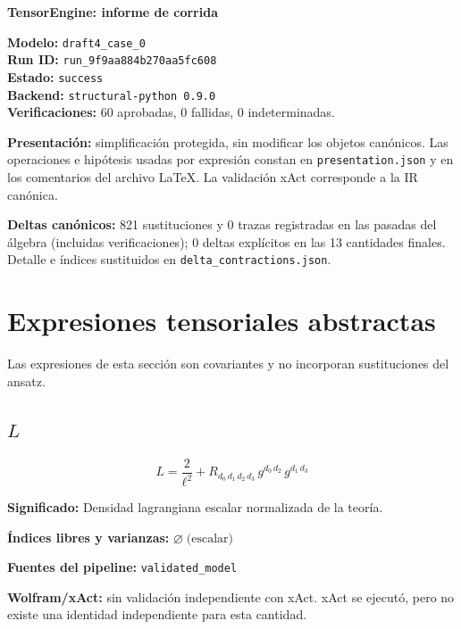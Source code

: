 \documentclass[11pt]{article}
\begin{document}
\begin{center}
{\Large\bfseries TensorEngine: informe de corrida}
\end{center}
\textbf{Modelo:} \texttt{draft4\_case\_0}\\
\textbf{Run ID:} \texttt{run\_9f9aa884b270aa5fc608}\\
\textbf{Estado:} \texttt{success}\\
\textbf{Backend:} \texttt{structural-python 0.9.0}\\
\textbf{Verificaciones:} 60 aprobadas, 0 fallidas, 0 indeterminadas.
\par\smallskip
\textbf{Presentación:} simplificación protegida, sin modificar los objetos canónicos. Las operaciones e hipótesis usadas por expresión constan en \texttt{presentation.json} y en los comentarios del archivo LaTeX. La validación xAct corresponde a la IR canónica.\par
\textbf{Deltas canónicos:} 821 sustituciones y 0 trazas registradas en las pasadas del álgebra (incluidas verificaciones); 0 deltas explícitos en las 13 cantidades finales. Detalle e índices sustituidos en \texttt{delta\_contractions.json}.\par
\section*{Expresiones tensoriales abstractas}
Las expresiones de esta sección son covariantes y no incorporan sustituciones del ansatz.
\subsection*{$ L $}
\begin{dmath*}[breakdepth={5}]
L = \frac{2}{{\ell}^{2}} + R{}_{d_{0}\,d_{1}\,d_{2}\,d_{3}}\,g{}^{d_{0}\,d_{2}}\,g{}^{d_{1}\,d_{3}}
\end{dmath*}
\par\vspace{1.2\baselineskip}\noindent
\begin{minipage}{\linewidth}
\textbf{Significado:} Densidad lagrangiana escalar normalizada de la teoría.\par
\textbf{Índices libres y varianzas:} $ \varnothing\;\text{(escalar)} $\par
\textbf{Fuentes del pipeline:} \texttt{validated\_model}\par
\textbf{Wolfram/xAct:} sin validación independiente con xAct. xAct se ejecutó, pero no existe una identidad independiente para esta cantidad.\par
\end{minipage}
\end{document}
